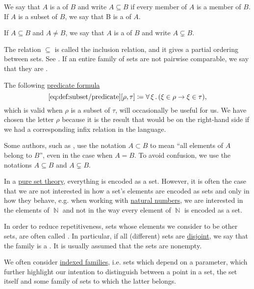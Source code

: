 \begin{definition}\label{def:subset}
  We say that \( A \) is a  of \( B \) and write \( A \subseteq B \) if every member of \( A \) is a member of \( B \). If \( A \) is a subset of \( B \), we say that B is a  of \( A \).

  If \( A \subseteq B \) and \( A \neq B \), we say that \( A \) is a  of \( B \) and write \( A \subsetneq B \).

  The relation \( \subseteq \) is called the inclusion relation, and it gives a partial ordering between sets. See . If an entire family of sets are not pairwise comparable, we say that they are .

  The following \hyperref[rem:predicate_formula]{predicate formula}
  \begin{equation*}\taglabel[\op{IsSubset}]{eq:def:subset/predicate}
    \ref{eq:def:subset/predicate}[\rho, \tau] \coloneqq \qforall \xi (\xi \in \rho \rightarrow \xi \in \tau),
  \end{equation*}
  which is valid when \( \rho \) is a subset of \( \tau \), will occasionally be useful for us. We have chosen the letter \( \rho \) because it is the result that would be on the right-hand side if we had a corresponding infix relation in the language.
\end{definition}

\begin{remark}\label{rem:subset_notation}
  Some authors, such as \cite{Kelley1975}, use the notation \( A \subset B \) to mean \enquote{all elements of \( A \) belong to \( B \)}, even in the case when \( A = B \). To avoid confusion, we use the notations \( A \subseteq B \) and \( A \subsetneq B \).
\end{remark}

\begin{remark}\label{rem:family_of_sets}
  In a \hyperref[rem:pure_set_theory]{pure set theory}, everything is encoded as a set. However, it is often the case that we are not interested in how a set's elements are encoded as sets and only in how they behave, e.g. when working with \hyperref[def:natural_numbers]{natural numbers}, we are interested in the elements of \( \BbbN \) and not in the way every element of \( \BbbN \) is encoded as a set.

  In order to reduce repetitiveness, sets whose elements we consider to be other sets, are often called . In particular, if all (different) sets are \hyperref[def:subset]{disjoint}, we say that the family is a . It is usually assumed that the sets are nonempty.

  We often consider \hyperref[def:cartesian_product/indexed_family]{indexed families}, i.e. sets which depend on a parameter, which further highlight our intention to distinguish between a point in a set, the set itself and some family of sets to which the latter belongs.
\end{remark}

